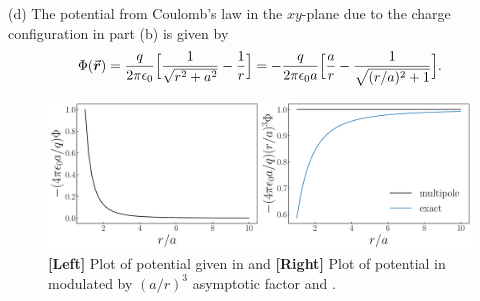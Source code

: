 {(d) The potential from Coulomb's law in the $xy$-plane due to the charge configuration in part (b) is given by
\begin{eqnarray}
    \label{eq:exact-coulomb}
    \Phi(\va*{r}) = \frac{q}{2 \pi \epsilon_0} \Big[ \frac{1}{\sqrt{r^2 + a^2}} - \frac{1}{r} \Big] = -\frac{q}{2 \pi \epsilon_0 a} \Big[ \frac{a}{r} - \frac{1}{\sqrt{(r/a)^2 + 1}} \Big]
.\end{eqnarray}

\begin{figure}[h!tb]
   \centering
   \includegraphics[width=\textwidth]{prob2.pdf}
   \caption{\textbf{[Left]} Plot of potential given in  and \textbf{[Right]} Plot of potential in  modulated by $(a/r)^3$ asymptotic factor and .}
\end{figure}



}




